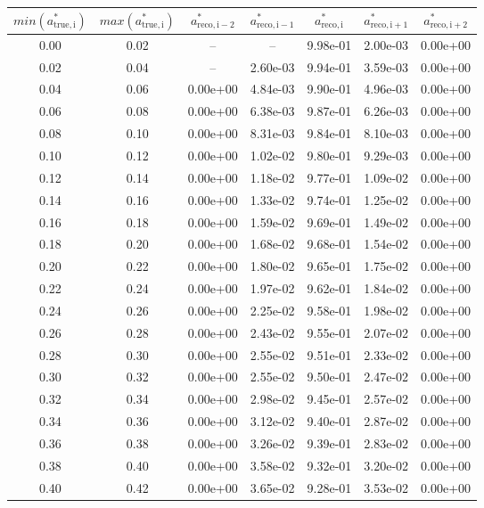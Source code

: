 \begin{tabular}{|cc||ccccc|} \hline 
$min(a^{*}_\mathrm{true,i})$ & $max(a^{*}_\mathrm{true,i})$ & $a^{*}_\mathrm{reco,i-2}$ & $a^{*}_\mathrm{reco,i-1}$ & $a^{*}_\mathrm{reco,i}$ & $a^{*}_\mathrm{reco,i+1}$ & $a^{*}_\mathrm{reco,i+2}$ \\ \hline 
 0.00 &  0.02 &  --  &  --  & 9.98e-01 & 2.00e-03 & 0.00e+00\\
 0.02 &  0.04 &  --  & 2.60e-03 & 9.94e-01 & 3.59e-03 & 0.00e+00\\
 0.04 &  0.06 & 0.00e+00 & 4.84e-03 & 9.90e-01 & 4.96e-03 & 0.00e+00\\
 0.06 &  0.08 & 0.00e+00 & 6.38e-03 & 9.87e-01 & 6.26e-03 & 0.00e+00\\
 0.08 &  0.10 & 0.00e+00 & 8.31e-03 & 9.84e-01 & 8.10e-03 & 0.00e+00\\
 0.10 &  0.12 & 0.00e+00 & 1.02e-02 & 9.80e-01 & 9.29e-03 & 0.00e+00\\
 0.12 &  0.14 & 0.00e+00 & 1.18e-02 & 9.77e-01 & 1.09e-02 & 0.00e+00\\
 0.14 &  0.16 & 0.00e+00 & 1.33e-02 & 9.74e-01 & 1.25e-02 & 0.00e+00\\
 0.16 &  0.18 & 0.00e+00 & 1.59e-02 & 9.69e-01 & 1.49e-02 & 0.00e+00\\
 0.18 &  0.20 & 0.00e+00 & 1.68e-02 & 9.68e-01 & 1.54e-02 & 0.00e+00\\
 0.20 &  0.22 & 0.00e+00 & 1.80e-02 & 9.65e-01 & 1.75e-02 & 0.00e+00\\
 0.22 &  0.24 & 0.00e+00 & 1.97e-02 & 9.62e-01 & 1.84e-02 & 0.00e+00\\
 0.24 &  0.26 & 0.00e+00 & 2.25e-02 & 9.58e-01 & 1.98e-02 & 0.00e+00\\
 0.26 &  0.28 & 0.00e+00 & 2.43e-02 & 9.55e-01 & 2.07e-02 & 0.00e+00\\
 0.28 &  0.30 & 0.00e+00 & 2.55e-02 & 9.51e-01 & 2.33e-02 & 0.00e+00\\
 0.30 &  0.32 & 0.00e+00 & 2.55e-02 & 9.50e-01 & 2.47e-02 & 0.00e+00\\
 0.32 &  0.34 & 0.00e+00 & 2.98e-02 & 9.45e-01 & 2.57e-02 & 0.00e+00\\
 0.34 &  0.36 & 0.00e+00 & 3.12e-02 & 9.40e-01 & 2.87e-02 & 0.00e+00\\
 0.36 &  0.38 & 0.00e+00 & 3.26e-02 & 9.39e-01 & 2.83e-02 & 0.00e+00\\
 0.38 &  0.40 & 0.00e+00 & 3.58e-02 & 9.32e-01 & 3.20e-02 & 0.00e+00\\
 0.40 &  0.42 & 0.00e+00 & 3.65e-02 & 9.28e-01 & 3.53e-02 & 0.00e+00\\

\end{tabular}
